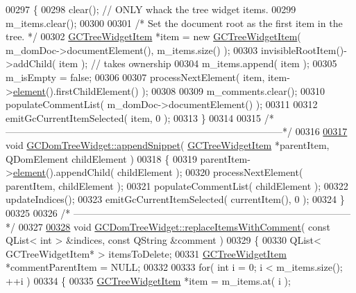 \begin{DoxyCode}
00297 \{
00298   clear();    \textcolor{comment}{// ONLY whack the tree widget items.}
00299   m\_items.clear();
00300 
00301   \textcolor{comment}{/* Set the document root as the first item in the tree. */}
00302   \hyperlink{class_g_c_tree_widget_item}{GCTreeWidgetItem} *item = \textcolor{keyword}{new} \hyperlink{class_g_c_tree_widget_item}{GCTreeWidgetItem}( m\_domDoc->documentElement(), 
      m\_items.size() );
00303   invisibleRootItem()->addChild( item );  \textcolor{comment}{// takes ownership}
00304   m\_items.append( item );
00305   m\_isEmpty = \textcolor{keyword}{false};
00306 
00307   processNextElement( item, item->\hyperlink{class_g_c_tree_widget_item_a584cad866bdbd94710d31eb77b804d84}{element}().firstChildElement() );
00308 
00309   m\_comments.clear();
00310   populateCommentList( m\_domDoc->documentElement() );
00311 
00312   emitGcCurrentItemSelected( item, 0 );
00313 \}
00314 
00315 \textcolor{comment}{/*
      --------------------------------------------------------------------------------------*/}
00316 
\hypertarget{gcdomtreewidget_8cpp_source_l00317}{}\hyperlink{class_g_c_dom_tree_widget_afdf29124d6e6cc6061f5e9978c6a7f81}{00317} \textcolor{keywordtype}{void} \hyperlink{class_g_c_dom_tree_widget_afdf29124d6e6cc6061f5e9978c6a7f81}{GCDomTreeWidget::appendSnippet}( \hyperlink{class_g_c_tree_widget_item}{GCTreeWidgetItem} *parentItem, QDomElement 
      childElement )
00318 \{
00319   parentItem->\hyperlink{class_g_c_tree_widget_item_a584cad866bdbd94710d31eb77b804d84}{element}().appendChild( childElement );
00320   processNextElement( parentItem, childElement );
00321   populateCommentList( childElement );
00322   updateIndices();
00323   emitGcCurrentItemSelected( currentItem(), 0 );
00324 \}
00325 
00326 \textcolor{comment}{/*
      --------------------------------------------------------------------------------------*/}
00327 
\hypertarget{gcdomtreewidget_8cpp_source_l00328}{}\hyperlink{class_g_c_dom_tree_widget_a0badfb9fc7250c5186fb9575019c335f}{00328} \textcolor{keywordtype}{void} \hyperlink{class_g_c_dom_tree_widget_a0badfb9fc7250c5186fb9575019c335f}{GCDomTreeWidget::replaceItemsWithComment}( \textcolor{keyword}{const} QList< int > &indices, \textcolor{keyword}{
      const} QString &comment )
00329 \{  
00330   QList< GCTreeWidgetItem* > itemsToDelete;
00331   \hyperlink{class_g_c_tree_widget_item}{GCTreeWidgetItem} *commentParentItem = NULL;
00332 
00333   \textcolor{keywordflow}{for}( \textcolor{keywordtype}{int} i = 0; i < m\_items.size(); ++i )
00334   \{
00335     \hyperlink{class_g_c_tree_widget_item}{GCTreeWidgetItem} *item = m\_items.at( i );

\end{DoxyCode}
